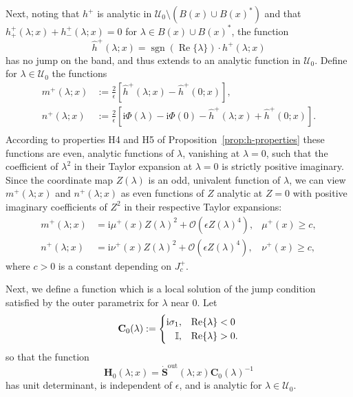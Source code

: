 \documentclass[12pt]{amsart}
\numberwithin{equation}{section}
\newcommand{\ii}{\mathrm{i}}
\newcommand{\SP}{\lambda}
\newcommand{\phaseint}{\Phi}
\newcommand{\eps}{\epsilon}
\newcommand{\bigo}[1]{ \mathcal{O}\! \left( #1 \right) }
\DeclareMathOperator{\sgn}{sgn}
\renewcommand{\Re}{\operatorname{Re}}
\begin{document}
Next, noting that $h^+$ is analytic in $\mathcal{U}_0 \setminus (B(x) \cup B(x)^*)$ and that $h^+_+(\SP;x) + h^+_-(\SP;x) = 0$ for $\lambda \in B(x) \cup B(x)^*$, the function 
\begin{equation}
	\hat h^+(\SP;x) = \sgn (\Re\{ \SP \}) \cdot h^+(\SP;x)
	\label{eq:h-hat}
\end{equation}
has no jump on the band, and thus extends to an analytic function in $\mathcal{U}_0$. Define for $\lambda\in\mathcal{U}_0$ the functions
\begin{equation}
\begin{aligned}
	m^+(\SP; x) &:= \frac{2}{\eps}\left[ \hat h^+(\SP;x) - \hat h^+(0;x) \right], \\
	n^+(\SP; x) &:= \frac{2}{\eps}\left[ \ii \phaseint(\SP) - \ii \phaseint(0) - \hat h^+(\SP;x) + \hat h^+(0;x) \right]. \\
\end{aligned}
\end{equation}
According to properties H4 and H5 of Proposition~\ref{prop:h-properties} these functions are even, analytic functions of $\SP$, vanishing at $\SP=0$, such that the coefficient of $\SP^2$ in their Taylor expansion at $\SP=0$ is strictly positive imaginary. Since the coordinate map $Z(\SP)$ is an odd, univalent function of $\SP$, we can view $m^+(\SP; x)$ and $n^+(\SP; x)$ as even functions of $Z$ analytic at $Z=0$  with positive imaginary coefficients of $Z^2$ in their respective Taylor expansions:
\begin{equation}
\begin{aligned}
	m^+(\SP; x) &= \ii \mu^+(x) Z(\SP)^2 + \bigo{\eps Z(\SP)^4}, & \mu^+(x) \geq c, \\
	n^+(\SP; x) &= \ii \nu^+(x) Z(\SP)^2 + \bigo{\eps Z(\SP)^4}, & \nu^+(x) \geq c,
\end{aligned}
\label{eq:m-n-expansions}
\end{equation}
where $c >0$ is a constant depending on $J^+_c$.

Next, we define a function which is a local solution of the jump condition satisfied by the outer parametrix for $\SP$ near $0$. Let
\begin{equation}
	\mathbf{C}_0(\SP) := \begin{cases} \ii \sigma_1, & \Re\{\SP\} < 0 \\ \hfill \mathbb{I}, & \Re\{\SP\} > 0. \end{cases}
	\label{eq:C0}
\end{equation}
so that the function 
\begin{equation}
	\mathbf{H}_0(\SP;x) = \dot{\mathbf{S}}^{\mathrm{out}}(\SP;x) \mathbf{C}_0(\SP)^{-1}
	\label{eq:H0}
\end{equation}
has unit determinant, is independent of $\eps$, and is analytic for $\SP \in \mathcal{U}_0$. 
\end{document}
